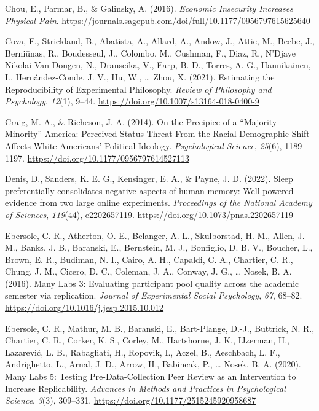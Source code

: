 \documentclass[
  english,
  a4paper,
]{article}
\newlength{\cslhangindent}
\newenvironment{CSLReferences}[2] %
{\begin{list}{}{%
			\setlength{\itemindent}{0pt}
			\setlength{\leftmargin}{0pt}
			\setlength{\parsep}{0pt}
			\ifodd #1
			\setlength{\leftmargin}{\cslhangindent}
			\setlength{\itemindent}{-1\cslhangindent}
			\fi
			\setlength{\itemsep}{#2\baselineskip}}}
	{\end{list}}
\begin{document}
\begin{CSLReferences}{1}{0}
Chou, E., Parmar, B., \& Galinsky, A. (2016). \emph{Economic {Insecurity Increases Physical Pain}}. \url{https://journals.sagepub.com/doi/full/10.1177/0956797615625640}

Cova, F., Strickland, B., Abatista, A., Allard, A., Andow, J., Attie, M., Beebe, J., Berniūnas, R., Boudesseul, J., Colombo, M., Cushman, F., Diaz, R., N'Djaye Nikolai Van Dongen, N., Dranseika, V., Earp, B. D., Torres, A. G., Hannikainen, I., Hernández-Conde, J. V., Hu, W., \ldots{} Zhou, X. (2021). Estimating the {Reproducibility} of {Experimental Philosophy}. \emph{Review of Philosophy and Psychology}, \emph{12}(1), 9--44. \url{https://doi.org/10.1007/s13164-018-0400-9}

Craig, M. A., \& Richeson, J. A. (2014). On the {Precipice} of a {``{Majority-Minority}''} {America}: {Perceived Status Threat From} the {Racial Demographic Shift Affects White Americans}' {Political Ideology}. \emph{Psychological Science}, \emph{25}(6), 1189--1197. \url{https://doi.org/10.1177/0956797614527113}

Denis, D., Sanders, K. E. G., Kensinger, E. A., \& Payne, J. D. (2022). Sleep preferentially consolidates negative aspects of human memory: {Well-powered} evidence from two large online experiments. \emph{Proceedings of the National Academy of Sciences}, \emph{119}(44), e2202657119. \url{https://doi.org/10.1073/pnas.2202657119}

Ebersole, C. R., Atherton, O. E., Belanger, A. L., Skulborstad, H. M., Allen, J. M., Banks, J. B., Baranski, E., Bernstein, M. J., Bonfiglio, D. B. V., Boucher, L., Brown, E. R., Budiman, N. I., Cairo, A. H., Capaldi, C. A., Chartier, C. R., Chung, J. M., Cicero, D. C., Coleman, J. A., Conway, J. G., \ldots{} Nosek, B. A. (2016). Many {Labs} 3: {Evaluating} participant pool quality across the academic semester via replication. \emph{Journal of Experimental Social Psychology}, \emph{67}, 68--82. \url{https://doi.org/10.1016/j.jesp.2015.10.012}

Ebersole, C. R., Mathur, M. B., Baranski, E., Bart-Plange, D.-J., Buttrick, N. R., Chartier, C. R., Corker, K. S., Corley, M., Hartshorne, J. K., IJzerman, H., Lazarević, L. B., Rabagliati, H., Ropovik, I., Aczel, B., Aeschbach, L. F., Andrighetto, L., Arnal, J. D., Arrow, H., Babincak, P., \ldots{} Nosek, B. A. (2020). Many {Labs} 5: {Testing Pre-Data-Collection Peer Review} as an {Intervention} to {Increase Replicability}. \emph{Advances in Methods and Practices in Psychological Science}, \emph{3}(3), 309--331. \url{https://doi.org/10.1177/2515245920958687}


\end{CSLReferences}
\end{document}

